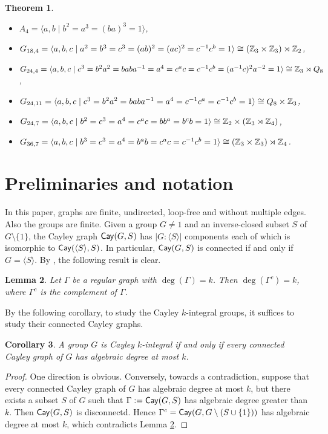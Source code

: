 \documentclass{amsart}
\newtheorem{thm}{Theorem}[section]
\newtheorem{lem}[thm]{Lemma}
\newtheorem{core}[thm]{Corollary}
\def\Cay{{\sf Cay}} \def\Ker{{\sf Ker}}
\begin{document}
\begin{thm}
\begin{itemize}
	\item[(17)] $A_4=\langle a,b\mid   b^2=a^3=(ba)^3=1\rangle$,
	\item[(18)] $G_{18,4}=\langle a,b,c\mid  a^2=b^3=c^3=(ab)^2=(ac)^2=c^{-1}c^b=1 \rangle\cong (\Bbb Z_3\times \Bbb Z_3)\rtimes \Bbb Z_2$,
	\item[(19)] $G_{24,4}=\langle a,b,c\mid  c^3=b^2a^2=baba^{-1}=a^4=c^ac=c^{-1}c^b=(a^{-1}c)^2a^{-2}=1 \rangle \cong\Bbb Z_3\rtimes Q_8$,
	\item[(20)] $G_{24,11}=\langle a,b,c\mid  c^3=b^2a^2=baba^{-1}=a^4=c^{-1}c^a=c^{-1}c^b=1\rangle\cong Q_8 \times\Bbb Z_3 $,
	\item[(21)] $G_{24,7}=\langle a,b,c\mid b^2=c^3=a^4=c^ac=bb^a=b^cb=1 \rangle\cong\Bbb Z_2\times(\Bbb Z_3\rtimes \Bbb Z_4)$,
	\item[(22)] $G_{36,7}=\langle a,b,c\mid  b^3=c^3=a^4=b^ab=c^ac= c^{-1}c^b=1 \rangle \cong(\Bbb Z_3\times \Bbb Z_3)\rtimes \Bbb Z_4$.
\end{itemize}
	\end{thm}
	
\section{Preliminaries and notation}
In this paper, graphs are finite, undirected, loop-free and without multiple edges. Also the groups are finite. Given a group $G\neq 1$ and an inverse-closed subset $S$ of $G\setminus\{1\}$, the Cayley graph
$\Cay(G,S)$ has $|G:\langle S\rangle|$ components each of which is isomorphic to  $\Cay(\langle S\rangle, S)$. In particular, $\Cay(G,S)$ is connected if and only if  $G=\langle S\rangle$. By \cite[Theorem 2.6]{Cvet}, the following result is clear.
\begin{lem}\label{regular}
	Let $\Gamma$ be a regular graph with $\deg(\Gamma)=k$. Then $\deg(\Gamma^c)=k$, where $\Gamma^c$ is the complement of $\Gamma$. 
\end{lem}

By the following corollary, to study the Cayley $k$-integral groups, it  suffices to study their connected Cayley graphs.
\begin{core}\label{connected}
	A group $G$ is Cayley $k$-integral if and only if every connected Cayley graph of $G$ has algebraic degree at most $k$.
\end{core}
\begin{proof}
	One direction is obvious. Conversely, towards a contradiction, suppose that every connected Cayley graph of $G$ has algebraic degree at most $k$, but there exists a subset $S$ of $G$ such that $\Gamma:=\Cay(G,S)$ has algebraic degree greater than $k$. Then $\Cay(G,S)$ is disconnectd. Hence $\Gamma^c=\Cay(G,G\setminus( S\cup\{1\}))$ has algebraic degree at most $k$, which contradicts Lemma \ref{regular}. 
\end{proof} 
\end{document}

